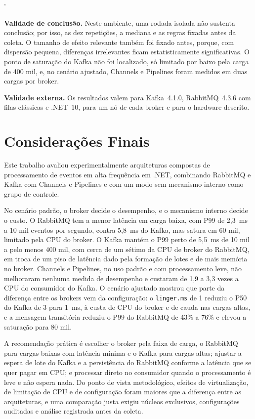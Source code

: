 '\documentclass[12pt]{article}
\begin{document}
\textbf{Validade de conclusão.} Neste ambiente, uma rodada isolada não sustenta
conclusão; por isso, as dez repetições, a mediana e as regras fixadas antes da coleta. O
tamanho de efeito relevante também foi fixado antes, porque, com dispersão pequena,
diferenças irrelevantes ficam estatisticamente significativas. O ponto de saturação do
Kafka não foi localizado, só limitado por baixo pela carga de 400 mil, e, no cenário
ajustado, Channels e Pipelines foram medidos em duas cargas por broker.

\textbf{Validade externa.} Os resultados valem para Kafka~4.1.0, RabbitMQ~4.3.6 com filas
clássicas e .NET~10, para um nó de cada broker e para o hardware descrito.


\section{Considerações Finais}
\label{sec:conclusao}

Este trabalho avaliou experimentalmente arquiteturas compostas de processamento de eventos
em alta frequência em .NET, combinando RabbitMQ e Kafka com Channels e Pipelines e com um
modo sem mecanismo interno como grupo de controle.

No cenário padrão, o broker decide o desempenho, e o mecanismo interno decide o custo. O
RabbitMQ tem a menor latência em carga baixa, com P99 de 2,3~ms a 10 mil eventos por
segundo, contra 5,8~ms do Kafka, mas satura em 60 mil, limitado pela CPU do broker. O
Kafka mantém o P99 perto de 5,5~ms de 10 mil a pelo menos 400 mil, com cerca de um sétimo
da CPU de broker do RabbitMQ, em troca de um piso de latência dado pela formação de lotes e
de mais memória no broker. Channels e Pipelines, no uso padrão e com processamento leve,
não melhoraram nenhuma medida de desempenho e custaram de 1,9 a 3,3 vezes a CPU do
consumidor do Kafka. O cenário ajustado mostrou que parte da diferença entre os brokers
vem da configuração: o \texttt{linger.ms} de 1 reduziu o P50 do Kafka de 3 para 1~ms, à
custa de CPU do broker e de cauda nas cargas altas, e a mensagem transitória reduziu o P99
do RabbitMQ de 43\% a 76\% e elevou a saturação para 80 mil.

A recomendação prática é escolher o broker pela faixa de carga, o RabbitMQ para cargas
baixas com latência mínima e o Kafka para cargas altas; ajustar a espera de lote do Kafka
e a persistência do RabbitMQ conforme a latência que se quer pagar em CPU; e processar
direto no consumidor quando o processamento é leve e não espera nada. Do ponto de vista
metodológico, efeitos de virtualização, de limitação de CPU e de configuração foram
maiores que a diferença entre as arquiteturas, e uma comparação justa exigiu núcleos
exclusivos, configurações auditadas e análise registrada antes da coleta.
\end{document}
